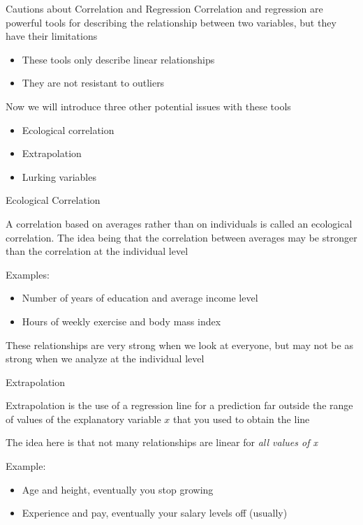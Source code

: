\documentclass{beamer}
\begin{document}
\begin{frame}{Cautions about Correlation and Regression}
	Correlation and regression are powerful tools for describing the relationship between two variables, but they have their limitations
	\begin{itemize}
		\item These tools only describe linear relationships
		\item They are not resistant to outliers 
	\end{itemize}
	Now we will introduce three other potential issues with these tools
	\begin{itemize}
		\item Ecological correlation
		\item Extrapolation
		\item Lurking variables
	\end{itemize}
\end{frame}

\begin{frame}{Ecological Correlation}
	
	A correlation based on averages rather than on individuals is called an \alert{ecological correlation}. The idea being that the correlation between averages may be stronger than the correlation at the individual level 
	
	Examples:
	\begin{itemize}
		\item Number of years of education and average income level
		\item Hours of weekly exercise and body mass index
	\end{itemize}
	
	These relationships are very strong when we look at everyone, but may not be as strong when we analyze at the individual level
	
\end{frame}

\begin{frame}{Extrapolation}
	
	\alert{Extrapolation} is the use of a regression line for a prediction far outside the range of values of the explanatory variable $x$ that you used to obtain the line
	
	The idea here is that not many relationships are linear for \textit{all values of x}
	
	Example:
	\begin{itemize}
		\item Age and height, eventually you stop growing 
		\item Experience and pay, eventually your salary levels off (usually)
	\end{itemize}
	
\end{frame}
\end{document}
